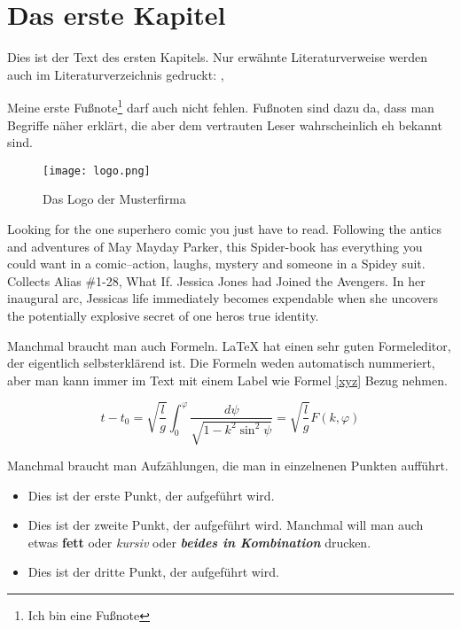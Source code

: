 
\chapter{Das erste Kapitel}
Dies ist der Text des ersten Kapitels.
Nur erwähnte Literaturverweise werden auch im Literaturverzeichnis gedruckt: \cite[S.12 ff]{baumgartner:2002}, \cite[S.1-3]{dreyfus:1980}

Meine erste Fußnote\footnote{Ich bin eine Fußnote} darf auch nicht fehlen.
Fußnoten sind dazu da, dass man Begriffe näher erklärt, die aber dem vertrauten Leser wahrscheinlich eh bekannt sind.

\begin{wrapfigure}{r}{.4\textwidth}
    \centering
    \texttt{[image: logo.png]}
    \vspace{-10pt}
    \caption{Das Logo der Musterfirma\footnotemark}
\end{wrapfigure}
Looking for the one superhero comic you just have to read.
Following the antics and adventures of May Mayday Parker, this Spider-book has everything you could want in a comic--action, laughs, mystery and someone in a Spidey suit.
Collects Alias \#1-28, What If. Jessica Jones had Joined the Avengers.
In her inaugural arc, Jessicas life immediately becomes expendable when she uncovers the potentially explosive secret of one heros true identity.

Manchmal braucht man auch Formeln. 
LaTeX hat einen sehr guten Formeleditor, der eigentlich selbsterklärend ist. 
Die Formeln weden automatisch nummeriert, aber man kann immer im Text mit einem Label wie Formel \ref{xyz} Bezug nehmen.

\begin{equation}
    t-t_{0}=\sqrt{\frac{l}{g}}\int_{0}^{\varphi}{\frac{d\psi}{\sqrt{1-k^{2}\sin^{2} {\psi}}}} = \sqrt{\frac{l}{g}} F(k,\varphi)
    \label{xyz}
\end{equation}

Manchmal braucht man Aufzählungen, die man in einzelnenen Punkten aufführt.
\begin{itemize}
    \item Dies ist der erste Punkt, der aufgeführt wird.
    \item Dies ist der zweite Punkt, der aufgeführt wird. Manchmal will man auch etwas \textbf{fett} oder \textit{kursiv} oder \textit{\textbf {beides in Kombination}} drucken.
    \item Dies ist der dritte Punkt, der aufgeführt wird.
\end{itemize}

